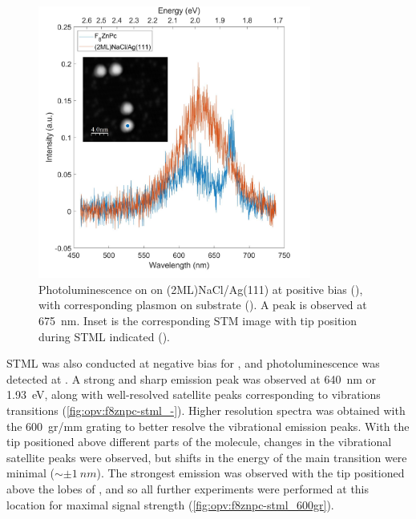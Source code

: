 \begin{figure} [H]
    \centering
        \includegraphics[width=0.8\textwidth]{pictures/f8znpc_+ve_emission_inset.png}
    \caption{Photoluminescence on  on (2ML)NaCl/Ag(111) at positive bias (), with corresponding plasmon on substrate (). A peak is observed at \SI{675}{nm}. Inset is the corresponding STM image with tip position during STML indicated (). }
    \label{fig:opv:f8znpc-stml_+}
\end{figure}

\ac{STML} was also conducted at negative bias for , and photoluminescence was detected at . A strong and sharp emission peak was observed at \SI{640}{nm} or \SI{1.93}{eV}, along with well-resolved satellite peaks corresponding to vibrations transitions (\autoref{fig:opv:f8znpc-stml_-}). Higher resolution spectra was obtained with the \SI{600}{gr/mm} grating to better resolve the vibrational emission peaks. With the tip positioned above different parts of the molecule, changes in the vibrational satellite peaks were observed, but shifts in the energy of the main transition were minimal ($\sim \pm \SI{1}{nm}$). The strongest emission was observed with the tip positioned above the lobes of , and so all further experiments were performed at this location for maximal signal strength (\autoref{fig:opv:f8znpc-stml_600gr}).



